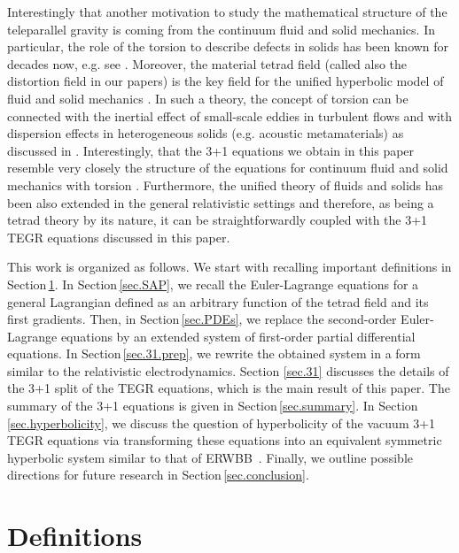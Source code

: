 \documentclass[
10pt, %
a4paper, %
oneside, %
twocolumn,
headinclude,footinclude, %
BCOR5mm, %
]{scrartcl}
\newcommand{\ERWBB}{{ERWBB}}
\begin{document}
	
	Interestingly that another motivation to study the mathematical structure of
	the teleparallel gravity is coming from the continuum fluid and solid
	mechanics. In particular, the role of the torsion to describe defects in
	solids has been known for decades now, e.g. see
	\cite{VolovichKatanaev1992,Hehl2007,Yavari2012,NguyenLeMarrec2022,Bohmer2020,Lychev2022}.
	Moreover, the material tetrad field (called also the distortion field in our
	papers) is the key field for the unified hyperbolic model of fluid and solid
	mechanics \cite{HPR2016,DPRZ2016}. In such a theory, the concept of torsion
	can be connected with the inertial effect of small-scale eddies in turbulent
	flows and with dispersion effects in heterogeneous solids (e.g. acoustic
	metamaterials) as discussed in \cite{Torsion2019}. Interestingly, that the
	3+1 equations we obtain in this paper resemble very closely the structure
	of the equations for continuum fluid and solid mechanics with torsion
	\cite{Torsion2019}. Furthermore, the unified theory of fluids and solids has
	been also extended in the general relativistic settings \cite{PTRSA2020} and
	therefore, as being a tetrad theory by its nature, it can be
	straightforwardly coupled with the 3+1 TEGR equations discussed in this
	paper.

	This work is organized as follows. We start with recalling important
	definitions in Section\,\ref{sec.def}. In Section\,\ref{sec.SAP}, we recall
	the Euler-Lagrange equations for a general Lagrangian defined as an
	arbitrary function of the tetrad field and its first gradients. Then, in
	Section\,\ref{sec.PDEs}, we replace the second-order Euler-Lagrange
	equations by an extended system of first-order partial differential
	equations. In Section\,\ref{sec.31.prep}, we rewrite the obtained system in
	a form similar to the relativistic electrodynamics. Section \ref{sec.31}
	discusses the details of the 3+1 split of the TEGR equations, which is the
	main result of this paper. The summary of the 3+1 equations is given in
	Section\,\ref{sec.summary}. In Section\,\ref{sec.hyperbolicity}, we discuss
	the question of hyperbolicity of the vacuum 3+1 TEGR equations via
	transforming these equations into an equivalent symmetric hyperbolic system similar to that of \ERWBB\ \cite{Estabrook1997,Buchman2003}. Finally, we
	outline possible directions for future research in
	Section\,\ref{sec.conclusion}.

	\section{Definitions}\label{sec.def}
	
\end{document}

